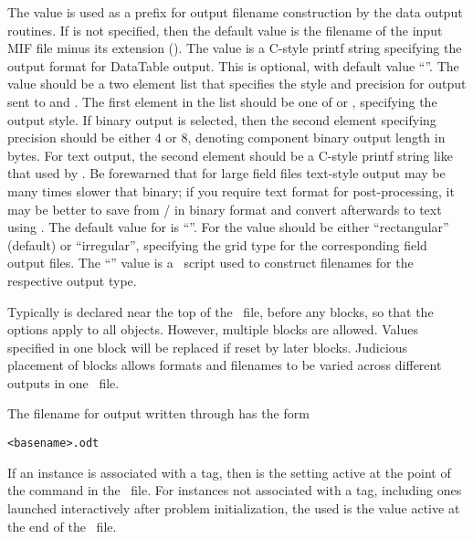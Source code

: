 \begin{description}
The  value is used as a prefix for output filename
construction by the data output routines.  If  is not
specified, then the default value is the filename of the input MIF file
minus its extension ().  The  value
is a C-style printf string specifying the output format for DataTable
output.  This is optional, with default value ``''.  The
 value
should be a two element list that specifies the style and precision for
output sent to  and
.  The first
element in the list should be one of  or ,
specifying the output style.  If binary output is selected, then the
second element specifying precision should be either 4 or 8, denoting
component binary output length in bytes. For text output, the second
element should be a C-style printf string like that used by
.
Be forewarned that for large field files text-style output may be many
times slower that binary; if you require text format for
post-processing, it may be better to save from
/ in binary format and convert afterwards to
text using .
The default value for
 is ``''.
For  the value should be either
``rectangular'' (default) or ``irregular'', specifying the grid type for
the corresponding field output files. The
``''
value is a \Tcl\ script used to construct filenames for the respective
output type.

Typically  is declared near the top of the \MIF\ file,
before any  blocks, so that the options apply to
all  objects. However, multiple  blocks are
allowed.  Values specified in one  block will be replaced
if reset by later  blocks. Judicious placement
of  blocks allows formats and filenames to be varied
across different outputs in one \MIF\ file.

The filename for  output written through 
has the form
\begin{verbatim}
<basename>.odt
\end{verbatim}
If an  instance is associated with a
tag,
then  is the setting active at
the point of the  command in the \MIF\ file.  For
 instances not associated with a  tag,
including ones launched interactively after problem initialization,
the  used is the value active at the end of the \MIF\ file.


\end{description}
